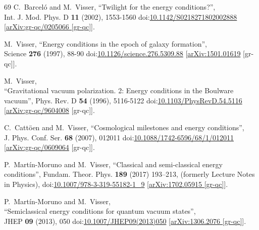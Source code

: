 \documentclass[12pt]{article}
\begin{document}
\begin{thebibliography}{69}
C.~Barcel\'o and M.~Visser,
``Twilight for the energy conditions?'',\\
Int. J. Mod. Phys. D \textbf{11} (2002), 1553-1560
doi:\href{https://doi.org/10.1142/S0218271802002888}{10.1142/S0218271802002888}
[\href{https://www.arxiv.org/abs/gr-qc/0205066}{arXiv:gr-qc/0205066 [gr-qc]}].

M.~Visser,
``Energy conditions in the epoch of galaxy formation'',\\
Science \textbf{276} (1997), 88-90
doi:\href{https://doi.org/10.1126/science.276.5309.88}{10.1126/science.276.5309.88}
[\href{https://www.arxiv.org/abs/1501.01619}{arXiv:1501.01619} [gr-qc]].

M.~Visser,\\
``Gravitational vacuum polarization. 2: Energy conditions in the Boulware vacuum'',
Phys. Rev. D \textbf{54} (1996), 5116-5122
doi:\href{https://doi.org/10.1103/PhysRevD.54.5116}{10.1103/PhysRevD.54.5116}
[\href{https://www.arxiv.org/abs/gr-qc/9604008}{arXiv:gr-qc/9604008} [gr-qc]].

\clearpage
{}
C.~Catt\"oen and M.~Visser,
``Cosmological milestones and energy conditions'',\\
J. Phys. Conf. Ser. \textbf{68} (2007), 012011
doi:\href{https://doi.org/10.1088/1742-6596/68/1/012011}{10.1088/1742-6596/68/1/012011}
[\href{https://www.arxiv.org/abs/gr-qc/0609064}{arXiv:gr-qc/0609064} [gr-qc]].

P.~Mart\'in-Moruno and M.~Visser,
``Classical and semi-classical energy conditions'',
Fundam. Theor. Phys. \textbf{189} (2017) 193--213,
(formerly Lecture Notes in Physics),
doi:\href{https://doi.org/10.1007/978-3-319-55182-1_9}{10.1007/978-3-319-55182-1\_9}
[\href{https://www.arxiv.org/abs/1702.05915}{arXiv:1702.05915 [gr-qc]}].

P.~Mart\'in-Moruno and M.~Visser,\\
``Semiclassical energy conditions for quantum vacuum states'',\\
JHEP \textbf{09} (2013), 050
doi:\href{https://doi.org/10.1007/JHEP09(2013)050}{10.1007/JHEP09(2013)050}
[\href{https://www.arxiv.org/abs/1306.2076}{arXiv:1306.2076 [gr-qc]}].


\end{thebibliography}
\end{document}
